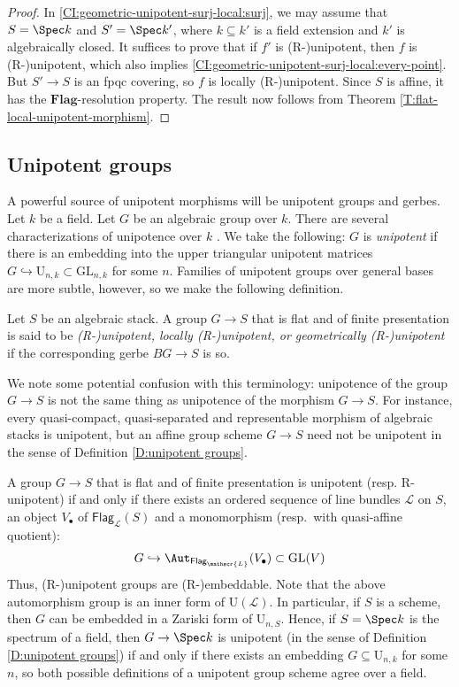 \documentclass[reqno,a4paper]{amsart}
\numberwithin{Theorem}{section}
\renewcommand{\GL}{\mathrm{GL}}
\renewcommand{\U}{\mathrm{U}}
\newcommand{\Flag}{\mathbf{Flag}}
\newcommand{\FLAG}{\mathsf{Flag}}
\theoremstyle{plain}
\theoremstyle{remark}
\newcommand{\classB}{B}
\begin{document}
\begin{proof}
  In \eqref{CI:geometric-unipotent-surj-local:surj}, we may assume that $S=\Spec k$ and $S'=\Spec k'$, where
  $k \subseteq k'$ is a field extension and $k'$ is algebraically closed. It suffices to prove that
  if $f'$ is (R-)unipotent, then $f$ is (R-)unipotent, which also implies \eqref{CI:geometric-unipotent-surj-local:every-point}. But $S' \to S$
  is an fpqc covering, so $f$ is locally (R-)unipotent. Since $S$ is
  affine, it has the $\Flag$-resolution property. The result now
  follows from Theorem \ref{T:flat-local-unipotent-morphism}.
\end{proof}

\subsection{Unipotent groups}\label{ss:unipotent-groups}
A powerful source of unipotent morphisms will be unipotent groups and
gerbes. Let $k$ be a field. Let $G$ be an algebraic group over
$k$. There are several characterizations of unipotence over $k$
\cite[Thm.~XVII.3.5]{SGA3-II-NEW}. We take the following: $G$ is
\emph{unipotent} if there is an embedding into the upper triangular
unipotent matrices $G \hookrightarrow \U_{n,k} \subset \GL_{n,k}$ for
some $n$. Families of unipotent groups over general bases are more
subtle, however, so we make the following definition.
\begin{Definition}\label{D:unipotent groups}
  Let $S$ be an algebraic stack. A group $G \to S$ that is flat and of finite presentation is said to be
  \emph{(R-)unipotent, locally (R-)unipotent, or geometrically
    (R-)unipotent} if the corresponding gerbe $\classB G \to S$ is so.
\end{Definition}
\begin{remark}
  We note some potential confusion with this terminology: unipotence of
  the group $G\to S$ is not the same thing as unipotence of the
  morphism $G\to S$. For instance, every quasi-compact, quasi-separated and
  representable morphism of algebraic stacks is unipotent, but an
  affine group scheme $G\to S$ need not be unipotent in the sense of
  Definition \ref{D:unipotent groups}.
\end{remark}
\begin{remark}\label{R:unipotent-group-char}
  A group $G\to S$ that is flat and of finite presentation is unipotent (resp. R-unipotent) if and only if there exists an
  ordered sequence of line bundles $\mathscr{L}$ on $S$, an object
  $V_{\bullet}$ of $\FLAG_{\mathscr{L}}(S)$ and a monomorphism (resp.\ with quasi-affine quotient):
  \[
    G \hookrightarrow \Aut_{\FLAG_{\mathscr{L}}}(V_{\bullet}) \subset \GL(V)
  \]
  Thus, (R-)unipotent groups are (R-)embeddable. Note that the above automorphism group is an inner form of
  $\U(\mathscr{L})$. In particular, if $S$ is a scheme, then $G$ can be embedded in a Zariski form of
  $\U_{n,S}$. Hence, if $S=\Spec k$ is the spectrum of a
  field, then $G\to\Spec k$ is unipotent (in the sense of Definition
  \ref{D:unipotent groups}) if and only if there exists an embedding
  $G\subseteq\U_{n,k}$ for some $n$, so both possible definitions of a unipotent group scheme agree over a field.
\end{remark}
\end{document}
